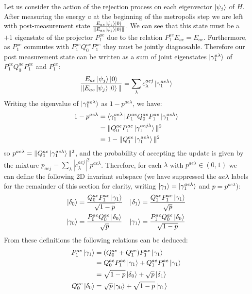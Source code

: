 \documentclass[aps,floatfix,10pt,amssymb,amsfont,amsmath,superscriptaddress,float,nofootinbib,longbibliography,nobalancelastpage,twocolumn]{revtex4-2}
\begin{document}
Let us consider the action of the rejection process on each eigenvector $\ket{\psi_j}$ of $H$. After measuring the energy $a$ at the beginning of the metropolis step we are left with post-measurement state $\frac{E_{ae}\ket{\psi_j}\ket{0}}{\|E_{ae} \ket{\psi_j}\ket{0}\|}$. We can see that this state must be a $+1$ eigenstate of the projector $P^{ae}_1$ due to the relation $P_1^{ae}E_{ae} = E_{ae}$.  Furthermore, as $P_1^{ae}$ commutes with $P^{ae}_1Q^{ae}_0P^{ae}_1$ they must be jointly diagnosable. Therefore our post measurement state can be written as a sum of joint eigenstates $\ket{\gamma_1^{a \lambda}}$ of $P^{ae}_1Q^{ae}_0P^{ae}_1$ and $P_1^{ae}$:
\begin{equation}
    \frac{E_{ae}\ket{\psi_j}\ket{0}}{\|E_{ae} \ket{\psi_j}\ket{0}\|} = \sum_{\lambda} c_{\lambda}^{aej}\ket{\gamma_1^{ae \lambda}}
\end{equation}
Writing the eigenvalue of $\ket{\gamma^{ae\lambda}_1}$ as $1-p^{ae\lambda}$, we have: \begin{align}1-p^{ae\lambda}&=\bra{\gamma^{ae\lambda}_1}P^{ae}_1Q^{ae}_0P^{ae}_1\ket{\gamma^{ae\lambda}_1} \\&=\|Q^{ae}_0P^{ae}_1\ket{\gamma^{aej\lambda}_1}\|^2\\ &= 1-\|Q^{ae}_1\ket{\gamma^{ae\lambda}_1}\|^2
\end{align}
so $p^{ae\lambda} = \|Q^{ae}_1\ket{\gamma^{ae\lambda}_1}\|^2$, and the probability of accepting the update is given by the mixture $p_{aej} = \sum_{\lambda}|c^{aej}_{\lambda}|^2p^{ae\lambda}$. Therefore, for each $\lambda$ with $p^{ae\lambda} \in (0,1)$ we can define the following 2D invariant subspace (we have suppressed the $ae\lambda$ labels for the remainder of this section for clarity, writing $\ket{\gamma_1} = \ket{\gamma^{ae\lambda}_1}$ and $p = p^{ae\lambda}$):
\begin{align}
    \ket{\delta_0} &= \frac{Q^{ae}_0P^{ae}_1\ket{\gamma_1}}{\sqrt{1-p}} &\ket{\delta_1} &= \frac{Q^{ae}_1P^{ae}_1\ket{\gamma_1}}{\sqrt{p}} \\
    \ket{\gamma_0} &= \frac{P^{ae}_0Q^{ae}_0\ket{\delta_0}}{\sqrt{p}} &\ket{\gamma_1} &= \frac{P^{ae}_1Q^{ae}_0\ket{\delta_0}}{\sqrt{1-p}}
\end{align}
From these definitions the following relations can be deduced:
\begin{align}
\begin{split}
\label{eq:deltagamma0}
    P^{ae}_1 \ket{\gamma_1} &= (Q^{ae}_0+Q^{ae}_1)P^{ae}_1 \ket{\gamma_1}\\
    &= Q^{ae}_0P^{ae}_1 \ket{\gamma_1}+Q^{ae}_1P^{ae}_1 \ket{\gamma_1}\\
    &= \sqrt{1-p} \ket{\delta_0} + \sqrt{p}\ket{\delta_1}\\
    Q^{ae}_0\ket{\delta_0} &= \sqrt{p} \ket{\gamma_0} + \sqrt{1-p} \ket{\gamma_1}
\end{split}
\end{align}
\end{document}
